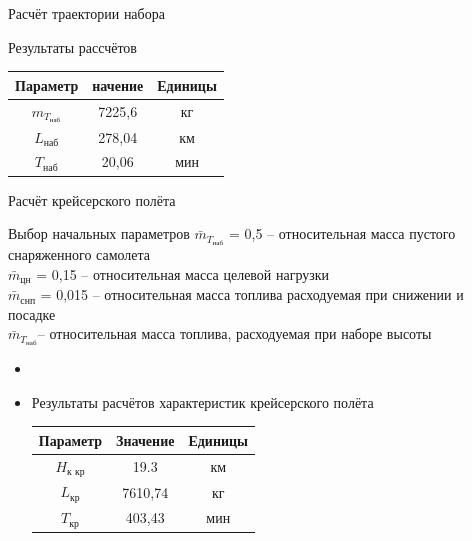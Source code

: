 \begin{frame}{Расчёт траектории набора}
    \begin{block}{Результаты рассчётов}
    \begin{table}
        \begin{tabular}{|c|c|c|}
            \hline
            Параметр&  начение & Единицы  \\ \hline
            $m_{T_{\text{наб}}}$& 7225,6 &кг \\ \hline
            $L_\text{наб}$& 278,04 &км \\ \hline
            $T_\text{наб}$& 20,06 & мин\\ \hline
        \end{tabular}
    \end{table}
    \end{block}
\end{frame}

\begin{frame}{Расчёт крейсерского полёта}
    \begin{block}{Выбор начальных параметров}
        $\bar{m}_{T_\text{наб}}$ = 0,5 – относительная масса пустого снаряженного самолета \\ 
        $\bar{m}_\text{цн}$ = 0,15 – относительная масса целевой нагрузки \\ 
        $\bar{m}_\text{снп}$ = 0,015 – относительная масса топлива 
        расходуемая при снижении и посадке  \\
        $\bar{m}_{T_\text{наб}}$– относительная масса топлива, расходуемая при наборе высоты \\
    \end{block}
    \begin{itemize}
        \item <+-> []
    \item <+-> [] \begin{block}{Результаты расчётов характеристик крейсерского полёта}
        \begin{table}
            \begin{tabular}{|c|c|c|}
                \hline
                Параметр& Значение & Единицы\\ \hline
                $H_\text{к \ кр}$& 19.3 & км\\ \hline
                $L_\text{кр}$& 7610,74 &кг \\ \hline
                $T_\text{кр}$& 403,43 & мин\\ \hline
            \end{tabular}
        \end{table}
    \end{block}
    \end{itemize}
\end{frame} 

